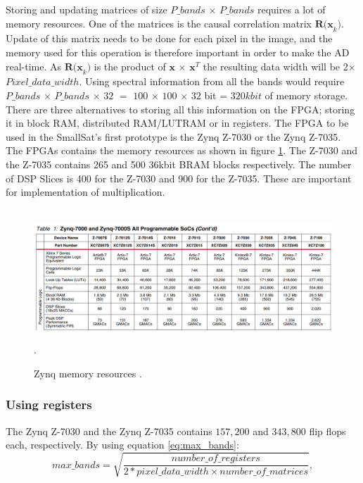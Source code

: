 Storing and updating matrices of size $P\_bands$ $\times$ $P\_bands$  requires a lot of memory resources. %
One of the matrices is the causal correlation matrix $\textbf{R(x}_k)$. Update of this matrix needs to be done for each pixel in the image, and the memory used for this operation is therefore important in order to make the AD real-time.  As $\textbf{R(x}_k)$ is the product of $\textbf{x}$ $\times$ $\textbf{x}^T$ the resulting data width will be 2$\times$ $Pixel\_data\_width$. Using spectral information from all the bands would require $P\_bands$ $\times$ $P\_bands$ $\times$ $32$ $=$ $100$ $\times$ $100$ $\times$ $32$ bit = $320 kbit$ of memory storage. 
\\

There are three alternatives to storing all this information on the FPGA; storing it in block RAM, distributed RAM/LUTRAM or in registers. The FPGA to be used in the SmallSat's first prototype is the Zynq Z-7030 or the Zynq Z-7035. 
The FPGAs contains the memory resources as shown in figure \ref{fig:zynq_memory_resources}. The Z-7030 and the Z-7035 contains 265 and 500 36kbit BRAM blocks respectively. The number of DSP Slices is 400 for the Z-7030 and 900 for the Z-7035. These are important for implementation of multiplication. 





\begin{figure}[H]
\hbox{\hspace*{-1cm}                               \includegraphics[scale=0.45]{images/zynq_memory_resources.PNG}}
  \caption{Zynq memory resources \cite{cite:mem_resources_zynq}.} 
  \label{fig:zynq_memory_resources}.
\end{figure}

\subsubsection{Using registers}
The Zynq Z-7030 and the Zynq Z-7035 contains $157,200$ and $343,800$ flip flops each, respectively. By using equation \ref{eq:max_bands}:%
\begin{equation}
    max\_bands= \sqrt{\frac{number\_of\_registers}{2*pixel\_data\_width \times number\_of\_matrices}},
    \label{eq:max_bands}
\end{equation}

